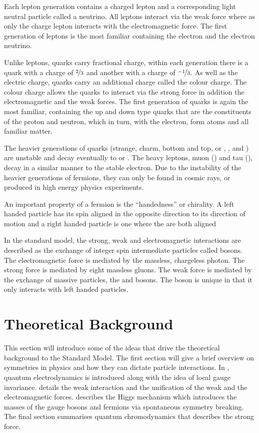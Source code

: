 Each lepton generation contains a charged lepton and a corresponding light
neutral particle called a neutrino. All leptons interact via the weak force
where as only the charge lepton interacts with the electromagnetic force.  The
first generation of leptons is the most familiar containing the electron and the
electron neutrino.

Unlike leptons, quarks carry fractional charge, within each generation there is
a quark with a charge of $\nicefrac{2}{3}$ and another with a charge of
$\nicefrac{-1}{3}$. As well as the electric charge, quarks carry an additional
charge called the colour charge. The colour charge allows the quarks to interact
via the strong force in addition the electromagnetic and the weak forces.
The first generation of quarks is again the most familiar, containing the up and
down type quarks that are the constituents of the proton and neutron, which in
turn, with the electron, form atoms and all familiar matter.


The heavier generations of quarks (strange, charm, bottom and top, or \Pstrange,
\Pcharm, \Pbottom and \Ptop) are unstable and decay eventually to \Pup or
\Pdown.
The heavy leptons, muon (\Pmuon) and tau (\Ptau), decay in a similar manner to
the stable electron. 
Due to the instability of the heavier generations of fermions, they can only be
found in  cosmic rays, or produced in high energy physics experiments.

An important property of a fermion is the ``handedness'' or chirality. A left
handed particle has its spin aligned in the opposite direction to its direction
of motion and a right handed particle is one where the are both aligned

In the standard model, the strong, weak and electromagnetic interactions are
described as the exchange of integer spin intermediate particles called bosons.
The electromagnetic force is mediated by the massless, chargeless photon. The
strong force is mediated by eight massless gluons. 
The weak force is mediated by the exchange of massive particles, the \PWpm and \PZ
bosons. The \PWpm boson is unique in that it only interacts with left handed
particles.



\section{Theoretical Background}
This section will introduce some of the ideas that drive the
theoretical background to the Standard Model.
The first section will give a brief overview on symmetries in physics and how
they can dictate particle interactions. In \SectionRef{}, quantum
electrodynamics is introduced along with the idea of local gauge invariance.
\SectionRef{} details the weak interaction and the unification of the weak 
and the electromagnetic forces. \SectionRef{} describes the Higgs mechanism
which introduces the masses of the gauge bosons and fermions via spontaneous
symmetry breaking. The final section summarises quantum chromodynamics that
describes the strong force.

